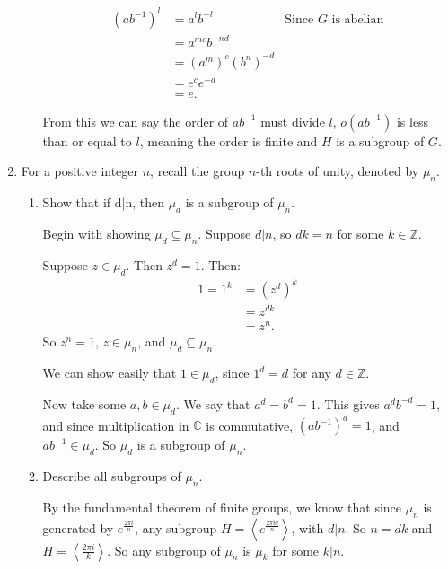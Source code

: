\documentclass{article}
\begin{document}
\begin{enumerate}
\begin{enumerate}[label= (\alph*)]
            \begin{align*}
                (ab^{-1})^{l}&= a^{l}b^{-l}&\text{Since $G$ is abelian} \\
                &= a^{mc}b^{-nd} \\
                &= (a^{m})^{c}(b^{n})^{-d} \\
                &= e^{c}e^{-d} \\
                &= e 
            .\end{align*}

            From this we can say the order of $ab^{-1}$ must divide $l$, $o(ab^{-1})$ is less than or equal to $l$, meaning the order is finite and $H$ is a subgroup of $G$.
    \end{enumerate}

\item For a positive integer $n$, recall the group $n$-th roots of unity,
    denoted by $\mu_n$.
    \begin{enumerate}[label= (\alph*)] 
        \item Show that if d|n, then $\mu_d$ is a subgroup of $\mu_n$.
            
            Begin with showing $\mu_d\subseteq \mu_n$. Suppose $d|n$, so $dk=n$ for some 
            $k\in \mathbb{Z}$. 

            Suppose $z\in \mu_d$. Then $z^{d}=1$. Then:
            \begin{align*}
                1=1^{k}&=(z^{d})^{k} \\
                &= z^{dk} \\
                &= z^{n}
            .\end{align*}
            So $z^{n}=1$, $z\in \mu_n$, and $\mu_d\subseteq \mu_n$.

            We can show easily that $1\in \mu_d$, since $1^{d}=d$ for any $d\in \mathbb{Z}$.

            Now take some $a,b\in  \mu_d$. We say that $a^{d}=b^{d}=1$. This gives $a^{d}b^{-d}=1$, and since multiplication in $\mathbb{C}$ is commutative, $(ab^{-1})^{d}=1$, and $ab^{-1}\in \mu_d$. So $\mu_d$ is a subgroup of $\mu_n$.

        \item Describe all subgroups of $\mu_n$.

            By the fundamental theorem of finite groups, we know that since $\mu_n$ is generated
            by $e^{\frac{2\pi i}{n}}$, any subgroup $H=\left<e^{\frac{2\pi id}{n}} \right>$, with
            $d|n$. So $n=dk$ and $H=\left<\frac{2\pi i}{k} \right>$. So any subgroup of 
            $\mu_n$ is $\mu_k$ for some $k|n$.


\end{enumerate}
\end{enumerate}
\end{document}
